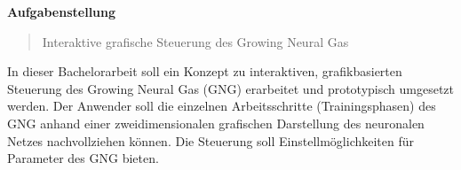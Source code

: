 \begingroup
\vspace*{\fill}
\centerline{\Large\textbf{Aufgabenstellung}}

\bigskip
\bigskip

\begin{quote}
\begin{center}
\Large
Interaktive grafische Steuerung des Growing Neural Gas
\end{center}
\end{quote}

\bigskip

In dieser Bachelorarbeit soll ein Konzept zu interaktiven, grafikbasierten Steuerung des Growing Neural
Gas (GNG) erarbeitet und prototypisch umgesetzt werden. Der Anwender soll die einzelnen
Arbeitsschritte (Trainingsphasen) des GNG anhand einer zweidimensionalen grafischen Darstellung des
neuronalen Netzes nachvollziehen können. Die Steuerung soll Einstellmöglichkeiten für Parameter des
GNG bieten.
\vspace*{\fill}
\endgroup
